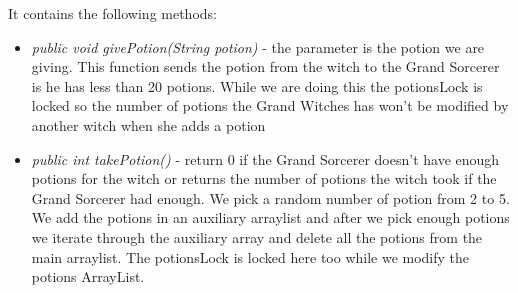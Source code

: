 \documentclass[14pt]{article}
\begin{document}
It contains the following methods:\\
\begin{itemize}
           \item \textit{public void givePotion(String potion)} - the parameter is the potion we are giving. This function sends the potion from the witch to the Grand Sorcerer is he has less than 20 potions. While we are doing this the potionsLock is locked so the number of potions the Grand Witches has won't be modified by another witch when she adds a potion
           
           \item \textit{public int takePotion()} - return 0 if the Grand Sorcerer doesn't have enough potions for the witch or returns the number of potions the witch took if the Grand Sorcerer had enough. We pick a random number of potion from 2 to 5. We add the potions in an auxiliary arraylist and after we pick enough potions we iterate through the auxiliary array and delete all the potions from the main arraylist. The potionsLock is locked here too while we modify the potions ArrayList.
\end{itemize}
\end{document}
